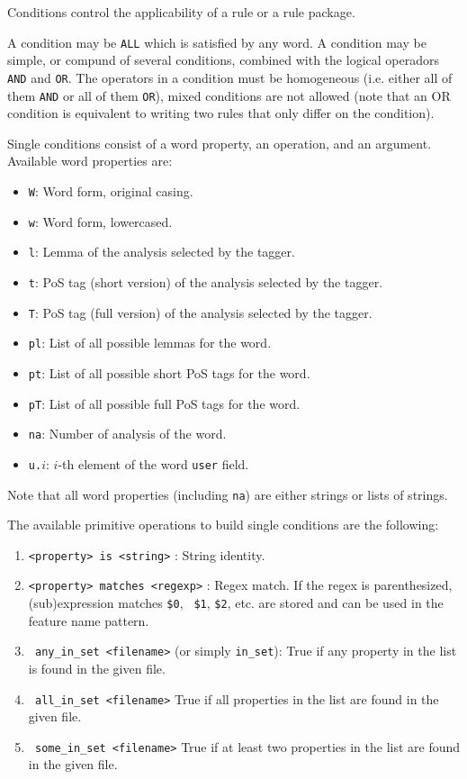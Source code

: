 \documentclass[a4paper]{book}
\begin{document}
   Conditions control the applicability of a rule or a rule package. 

   A condition may be {\tt ALL} which is satisfied by any word.  A
   condition may be simple, or compund of several conditions, combined
   with the logical operadors {\tt AND} and {\tt OR}. The operators in
   a condition must be homogeneous (i.e. either all of them {\tt AND}
   or all of them {\tt OR}), mixed conditions are not allowed (note
   that an OR condition is equivalent to writing two rules that only
   differ on the condition).

   Single conditions consist of a word property, an operation, and an
   argument.  Available word properties are:
   \begin{itemize}
     \itemsep 0cm
   \item {\tt W}: Word form, original casing.
   \item {\tt w}: Word form, lowercased.
   \item {\tt l}: Lemma of the analysis selected by the tagger.
   \item {\tt t}: PoS tag (short version) of the analysis selected by the tagger.
   \item {\tt T}: PoS tag (full version) of the analysis selected by the tagger.
   \item {\tt pl}: List of all possible lemmas for the word.
   \item {\tt pt}: List of all possible short PoS tags for the word.
   \item {\tt pT}: List of all possible full PoS tags for the word.
   \item {\tt na}: Number of analysis of the word. 
   \item {\tt u.}$i$: $i$-th element of the word {\tt user} field.
   \end{itemize}

   Note that all word properties (including {\tt na}) are either
   strings or lists of strings.

   The available primitive operations to build single conditions are
   the following:
   \begin{enumerate}
     \itemsep 0cm
     \item {\tt <property> is <string>} :  String identity.
     \item {\tt <property> matches <regexp>} : Regex match. If the
       regex is parenthesized, (sub)expression matches {\tt \$0}, {\tt
         \$1}, {\tt \$2}, etc. are stored and can be used in the
       feature name pattern.
     \item {\tt <property-list> any\_in\_set <filename>}  (or simply {\tt in\_set}): True if any property in the list is found in the given file.
     \item {\tt <property-list> all\_in\_set <filename>} True if all properties in the list are found in the given file.
     \item {\tt <property-list> some\_in\_set <filename>} True if at least two properties in the list are found in the given file.
   \end{enumerate}
\end{document}
